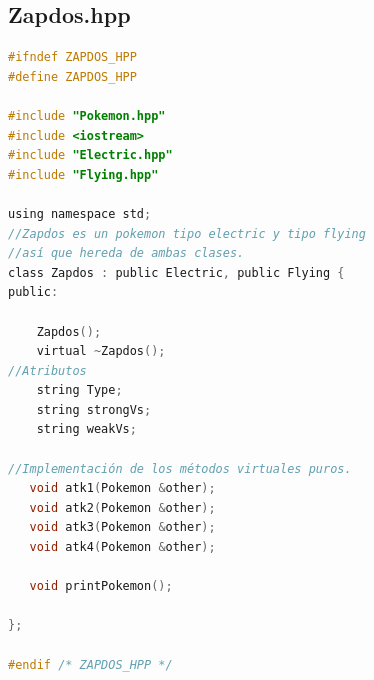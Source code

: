 \documentclass[11pt]{article}
\begin{document}
\subsection{Zapdos.hpp}
\begin{lstlisting}[language=C]
#ifndef ZAPDOS_HPP
#define ZAPDOS_HPP

#include "Pokemon.hpp"
#include <iostream>
#include "Electric.hpp"
#include "Flying.hpp"

using namespace std;
//Zapdos es un pokemon tipo electric y tipo flying
//así que hereda de ambas clases.
class Zapdos : public Electric, public Flying {
public:

    Zapdos();
    virtual ~Zapdos();
//Atributos
    string Type; 
    string strongVs;
    string weakVs;

//Implementación de los métodos virtuales puros. 
   void atk1(Pokemon &other);
   void atk2(Pokemon &other);
   void atk3(Pokemon &other);
   void atk4(Pokemon &other);

   void printPokemon();

};

#endif /* ZAPDOS_HPP */




\end{lstlisting}
\end{document}
